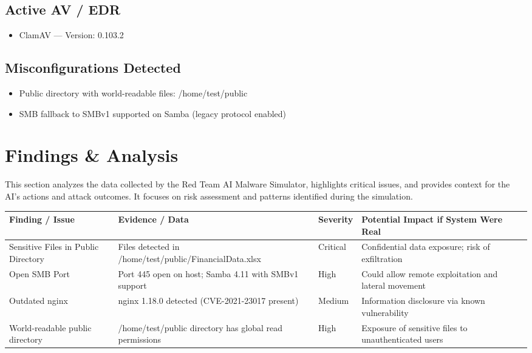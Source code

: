 \documentclass[a4paper,12pt]{article}
\begin{document}
\subsection*{Active AV / EDR}
\begin{itemize}
    
        \item ClamAV — Version: 0.103.2
    
\end{itemize}

\subsection*{Misconfigurations Detected}
\begin{itemize}
    
        \item Public directory with world-readable files: /home/test/public
    
        \item SMB fallback to SMBv1 supported on Samba (legacy protocol enabled)
    
\end{itemize}

\newpage


\section*{Findings \& Analysis}

This section analyzes the data collected by the Red Team AI Malware Simulator, highlights critical issues, and provides context for the AI’s actions and attack outcomes. It focuses on risk assessment and patterns identified during the simulation.

\begin{longtable}{|p{4cm}|p{6cm}|p{2cm}|p{3cm}|}
\hline
\textbf{Finding / Issue} & \textbf{Evidence / Data} & \textbf{Severity} & \textbf{Potential Impact if System Were Real} \\
\hline

Sensitive Files in Public Directory & Files detected in /home/test/public/FinancialData.xlsx & Critical & Confidential data exposure; risk of exfiltration \\
\hline

Open SMB Port & Port 445 open on host; Samba 4.11 with SMBv1 support & High & Could allow remote exploitation and lateral movement \\
\hline

Outdated nginx & nginx 1.18.0 detected (CVE-2021-23017 present) & Medium & Information disclosure via known vulnerability \\
\hline

World-readable public directory & /home/test/public directory has global read permissions & High & Exposure of sensitive files to unauthenticated users \\
\hline

\end{longtable}
\end{document}
